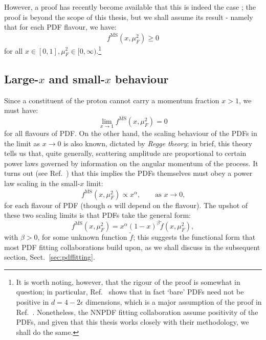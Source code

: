\documentclass[withindex,glossary]{cam-thesis}
\begin{document}
However, a proof has recently become available that this is indeed the case \cite{Candido:2020yat}; the proof is beyond the scope of this thesis, but we shall assume its result - namely that for each PDF flavour, we have:
\begin{equation}
f^{\overline{\text{MS}}}(x,\mu_F^2) \geq 0
\end{equation}
for all $x \in [0,1], \mu_F^2 \in [0,\infty)$.\footnote{It is worth noting, however, that the rigour of the proof is somewhat in question; in particular, Ref.~\cite{Collins:2021vke} shows that in fact `bare' PDFs need not be positive in $d = 4 - 2\epsilon$ dimensions, which is a major assumption of the proof in Ref.~\cite{Candido:2020yat}. Nonetheless, the NNPDF fitting collaboration assume positivity of the PDFs, and given that this thesis works closely with their methodology, we shall do the same.}

\subsection{Large-$x$ and small-$x$ behaviour}
\label{sec:pdf_scaling}
Since a constituent of the proton cannot carry a momentum fraction $x > 1$, we must have:
\begin{equation}
\lim_{x \rightarrow 1} f^{\overline{\text{MS}}}(x, \mu_F^2) = 0
\end{equation}
for all flavours of PDF. On the other hand, the scaling behaviour of the PDFs in the limit as $x \rightarrow 0$ is also known, dictated by \textit{Regge theory}; in brief, this theory tells us that, quite generally, scattering amplitude are proportional to certain power laws governed by information on the angular momentum of the process. It turns out (see Ref.~\cite{Abarbanel:1969eh}) that this implies the PDFs themselves must obey a power law scaling in the small-$x$ limit:
\begin{equation}
f^{\overline{\text{MS}}}(x,\mu_F^2) \propto x^{\alpha}, \qquad \text{as $x \rightarrow 0$,}
\end{equation}
for each flavour of PDF (though $\alpha$ will depend on the flavour). The upshot of these two scaling limits is that PDFs take the general form:
\begin{equation}
f^{\overline{\text{MS}}}(x,\mu_F^2) = x^{\alpha} (1-x)^{\beta} \tilde{f}(x,\mu_F^2),
\end{equation}
with $\beta > 0$, for some unknown function $\tilde{f}$; this suggests the functional form that most PDF fitting collaborations build upon, as we shall discuss in the subsequent section, Sect.~\ref{sec:pdffitting}.
\end{document}
